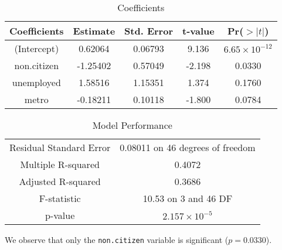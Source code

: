 \documentclass{article}
\theoremstyle{mytheoremstyle}
\theoremstyle{mytheoremstyle}
\theoremstyle{myproblemstyle}
\begin{document}
      \begin{table}[H]
        \caption{Coefficients}\label{tab:coefficients}
        \vspace{0.05in}
        \centering
        \begin{tabular}{ccccc}
          \toprule
          Coefficients & Estimate & Std. Error & t-value & Pr($>|t|$) \\ 
          \midrule
          (Intercept) & 0.62064 & 0.06793 & 9.136 & \(6.65 \times 10^{-12}\) \\
          non.citizen & -1.25402 & 0.57049 & -2.198 & 0.0330 \\
          unemployed & 1.58516 & 1.15351 & 1.374 & 0.1760 \\
          metro & -0.18211 & 0.10118 & -1.800 & 0.0784 \\
          \bottomrule
        \end{tabular}
      \end{table}
      \vspace{0.1in}
      \begin{table}[H]
        \centering
        \caption{Model Performance}\label{tab:performance}
        \vspace{0.05in}
        \begin{tabular}{cc}
          \toprule
          Residual Standard Error & 0.08011 on 46 degrees of freedom \\ 
          Multiple R-squared & 0.4072 \\ 
          Adjusted R-squared & 0.3686 \\ 
          F-statistic & 10.53 on 3 and 46 DF \\ 
          p-value & \(2.157 \times 10^{-5}\)\\ 
          \bottomrule
        \end{tabular}
      \end{table}

      We observe that only the \verb|non.citizen| variable is significant ($p = 0.0330$).
      \vspace{0.1in}
\end{document}
